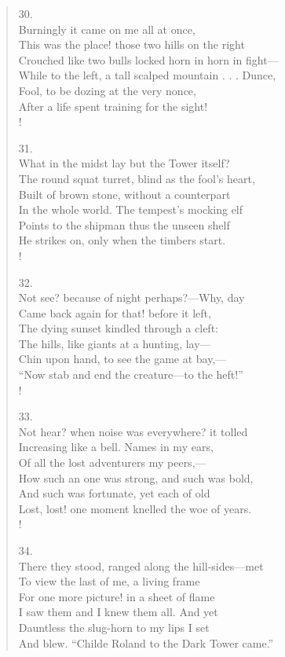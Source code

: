 \documentclass[10pt]{memoir}
\begin{document}
\begin{verse}
30.\\
Burningly it came on me all at once,\\
\vin This was the place! those two hills on the right\\
\vin Crouched like two bulls locked horn in horn in fight---\\
While to the left, a tall scalped mountain . . . Dunce,\\
Fool, to be dozing at the very nonce,\\
\vin After a life spent training for the sight!\\!

31.\\
What in the midst lay but the Tower itself?\\
\vin The round squat turret, blind as the fool's heart,\\
\vin Built of brown stone, without a counterpart\\
In the whole world. The tempest's mocking elf\\
Points to the shipman thus the unseen shelf\\
\vin He strikes on, only when the timbers start.\\!

32.\\
Not see? because of night perhaps?---Why, day\\
\vin Came back again for that! before it left,\\
\vin The dying sunset kindled through a cleft:\\
The hills, like giants at a hunting, lay---\\
Chin upon hand, to see the game at bay,---\\
\vin ``Now stab and end the creature---to the heft!''\\!

33.\\
Not hear? when noise was everywhere? it tolled\\
\vin Increasing like a bell. Names in my ears,\\
\vin Of all the lost adventurers my peers,---\\
How such an one was strong, and such was bold,\\
And such was fortunate, yet each of old\\
\vin Lost, lost! one moment knelled the woe of years.\\!

34.\\
There they stood, ranged along the hill-sides---met\\
\vin To view the last of me, a living frame\\
\vin For one more picture! in a sheet of flame\\
I saw them and I knew them all. And yet\\
Dauntless the slug-horn to my lips I set\\
\vin And blew. ``Childe Roland to the Dark Tower came.''
\end{verse}
\end{document}
